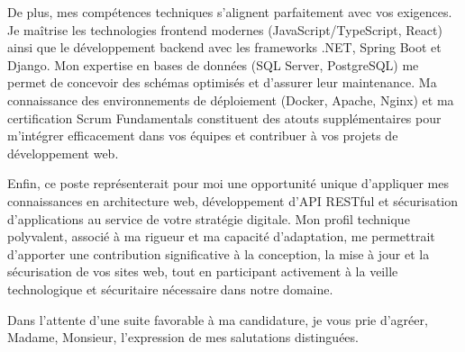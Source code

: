 \documentclass[11pt, a4paper]{../../../awesome-cv}
\begin{document}
\begin{cvletter}
\indent De plus, mes compétences techniques s'alignent parfaitement avec vos exigences. Je maîtrise les technologies frontend modernes (JavaScript/TypeScript, React) ainsi que le développement backend avec les frameworks .NET, Spring Boot et Django. Mon expertise en bases de données (SQL Server, PostgreSQL) me permet de concevoir des schémas optimisés et d'assurer leur maintenance. Ma connaissance des environnements de déploiement (Docker, Apache, Nginx) et ma certification Scrum Fundamentals constituent des atouts supplémentaires pour m'intégrer efficacement dans vos équipes et contribuer à vos projets de développement web.

\indent Enfin, ce poste représenterait pour moi une opportunité unique d'appliquer mes connaissances en architecture web, développement d'API RESTful et sécurisation d'applications au service de votre stratégie digitale. Mon profil technique polyvalent, associé à ma rigueur et ma capacité d'adaptation, me permettrait d'apporter une contribution significative à la conception, la mise à jour et la sécurisation de vos sites web, tout en participant activement à la veille technologique et sécuritaire nécessaire dans notre domaine.

Dans l'attente d'une suite favorable à ma candidature, je vous prie d'agréer, Madame, Monsieur, l'expression de mes salutations distinguées.

\end{cvletter}

\makeletterclosing
\end{document}
